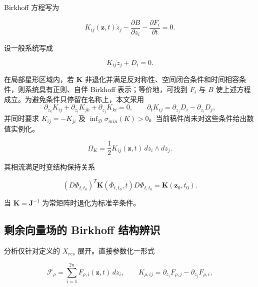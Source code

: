 Birkhoff 方程写为

\begin{equation}
\label{eq:symplectic-kam-5-6}
\boxed{K_{ij}\left( \mathbf{z},t \right){\dot{z}}_{j} - \frac{\partial B}{\partial z_{i}} - \frac{\partial F_{i}}{\partial t} = 0.}
\end{equation}

设一般系统写成

\begin{equation}
\label{eq:symplectic-kam-5-7}
K_{ij}{\dot{z}}_{j} + D_{i} = 0.
\end{equation}

在局部星形区域内，若 \(\mathbf{K}\) 非退化并满足反对称性、空间闭合条件和时间相容条件，则系统具有正则、自伴 Birkhoff 表示；等价地，可找到 \(F_{i}\) 与 \(B\) 使上述方程成立\cite{FengQin2010,HairerLubichWanner2006GNI}。为避免条件只停留在名称上，本文采用
\[
\partial_{z_k}K_{ij}+\partial_{z_i}K_{jk}+\partial_{z_j}K_{ki}=0,\qquad
\partial_t K_{ij}=\partial_{z_j}D_i-\partial_{z_i}D_j,
\]
并同时要求 \(K_{ij}=-K_{ji}\) 及 \(\inf_{\mathcal{D}}\sigma_{min}(K)>0\)。当前稿件尚未对这些条件给出数值实例化。

\begin{equation}
\label{eq:symplectic-kam-5-8}
\Omega_{K} = \frac{1}{2}K_{ij}\left( \mathbf{z},t \right)\, dz_{i} \land dz_{j}.
\end{equation}

其相流满足时变结构保持关系

\begin{equation}
\label{eq:symplectic-kam-5-9}
\left( D\Phi_{t,t_{0}} \right)^{T}\mathbf{K}\left( \Phi_{t,t_{0}},t \right)D\Phi_{t,t_{0}} = \mathbf{K}\left( \mathbf{z}_{0},t_{0} \right).
\end{equation}

当 \(\mathbf{K} = \mathbf{J}^{- 1}\) 为常矩阵时退化为标准辛条件。

\subsection{剩余向量场的 Birkhoff 结构辨识}\label{sec:symplectic-kam-5-4}

分析仅针对定义的 \(X_{res}\) 展开。直接参数化一形式

\begin{equation}
\label{eq:symplectic-kam-5-10}
\mathcal{F}_{\rho} = \sum_{i = 1}^{2n}F_{\rho,i}\left( \mathbf{z},t \right)\, dz_{i},\quad\quad K_{\rho,ij} = \partial_{z_{i}}F_{\rho,j} - \partial_{z_{j}}F_{\rho,i},
\end{equation}

